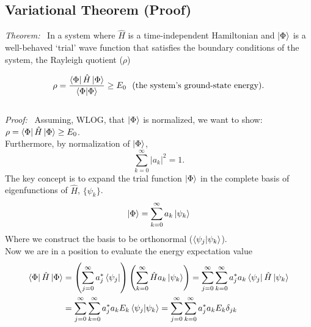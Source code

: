 \documentclass{article}[11pt]
\renewcommand{\d}{\delta}    %
\newcommand{\p}{\rho}        %
\newcommand{\F}{\Phi}        %
\newcommand{\y}{\ensuremath{\psi}}
\begin{document}
\subsection*{Variational Theorem (Proof)}
{\it Theorem:} \ 
   In a system where $\hat{H}$ is a time-independent Hamiltonian and $\ket{\F}$ is a well-behaved `trial' wave function that satisfies the boundary conditions of the system, the Rayleigh quotient ($\p$)
   
\begin{equation}
    \p
= 
    \frac{
       \bra{\F} \hat{H} \ket{\F}}
       {\braket{\F | \F}
    }
\geq
    E_0 \
    \mbox{ (the system's ground-state energy).}
\end{equation}
\\
{\it Proof:} \ Assuming, WLOG, that $\ket{\F}$ is normalized, we want to show: $\p =\bra{\F} \hat{H} \ket{\F} \geq E_0 $. \vspace{0.3cm} \\
Furthermore, by normalization of $\ket{\F}$, 
\begin{equation}
   \sum
      \limits_{k=0}^{\infty} 
         | a_k |^2
= 
   1.
\end{equation}
The key concept is to expand the trial function $\ket{\F}$ in the complete basis of eigenfunctions of $\hat{H}$, $\{\y_k \}$.
\begin{equation}
   \ket{\F} 
= 
   \sum\limits_{k=0}^{\infty} a_k \ket{\y_k}
\end{equation}
Where we construct the basis to be orthonormal ($\braket{\y_j | \y_k}$). \\
Now we are in a position to evaluate the energy expectation value
\begin{align*}
   \bra{\F} 
      \hat{H}
   \ket{\F}
&=  
   \left(
      \sum
         \limits_{j=0}^{\infty}
            a_j^*
            \bra{\y_j}
   \right)
   \left(
      \sum
         \limits_{k=0}^{\infty}
         \hat{H}
         a_k 
         \ket{\y_k}
   \right)
=  
    \sum
    \limits_{j=0}^{\infty}
    \sum
    \limits_{k=0}^{\infty}
    a_j^*
    a_k
        \bra{\y_j}
           \hat{H}
        \ket{\y_k}
\\&=  
    \sum
    \limits_{j=0}^{\infty}
    \sum
    \limits_{k=0}^{\infty}
    a_j^*
    a_k
    E_k
        \braket{\y_j | \y_k} 
=  
    \sum
    \limits_{j=0}^{\infty}
    \sum
    \limits_{k=0}^{\infty}
    a_j^*
    a_k
    E_k
    \d_{jk} 
\end{align*}
\end{document}
